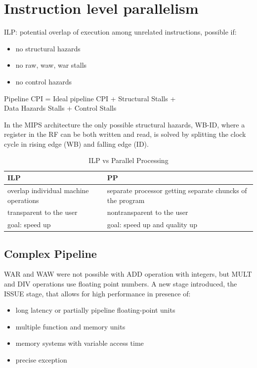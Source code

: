 
\section{Instruction level parallelism}\label{sec:instruction-level-parallelism}
ILP: potential overlap of execution among unrelated instructions, possible if:
\begin{itemize}
    \item no structural hazards
    \item no raw, waw, war stalls
    \item no control hazards
\end{itemize}

\begin{center}
    Pipeline CPI = Ideal pipeline CPI + Structural Stalls +\\Data Hazards Stalls + Control Stalls
\end{center}

In the MIPS architecture the only possible structural hazards, WB-ID, where a register in the RF can be both written
and read, is solved by splitting the clock cycle in rising edge (WB) and falling edge (ID).


\begin{table}[h]
    \centering
    \begin{tabular}{|p{3cm}|p{3.5cm}|}
        \toprule
        \textbf{ILP} & \textbf{PP} \\
        \midrule
        overlap individual machine operations & separate processor getting separate chuncks of the program \\
        \midrule
        transparent to the user & nontransparent to the user \\
        \midrule
        goal: speed up & goal: speed up and quality up \\
        \bottomrule
    \end{tabular}
    \caption{ILP vs Parallel Processing}
    \label{tab:ILP-vs-PP}
\end{table}


\subsection{Complex Pipeline}\label{subsec:complex-pipeline}
WAR and WAW were not possible with ADD operation with integers, but MULT and DIV operations use floating point numbers.
A new stage introduced, the ISSUE stage, that allows for high performance in presence of:
\begin{itemize}
    \item long latency or partially pipeline floating-point units
    \item multiple function and memory units
    \item memory systems with variable access time
    \item precise exception
\end{itemize}

